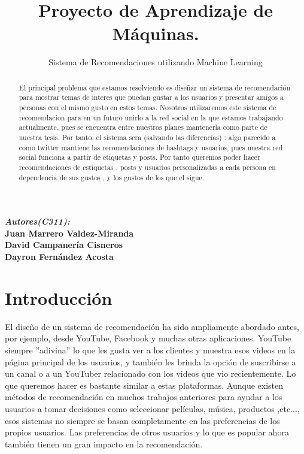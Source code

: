 \documentclass[12pt,a4paper]{article}
\author{Sistema de Recomendaciones utilizando Machine Learning}
\title{Proyecto de Aprendizaje de Máquinas.}
\begin{document}
\maketitle
\begin{abstract}
El principal problema que estamos resolviendo es diseñar un sistema de recomendación para mostrar temas de interes que puedan gustar a los usuarios y presentar amigos a personas con el mismo gusto en estos temas. Nosotros utilizaremos este sistema de recomendacion para en un futuro unirlo a la red social en la que estamos trabajando actualmente, pues se encuentra entre nuestros planes mantenerla como parte de nuestra tesis. Por tanto, el sistema sera (salvando las diferencias) : algo parecido a como twitter mantiene las recomendaciones de hashtags y usuarios, pues nuestra red social funciona a partir de etiquetas y posts. Por tanto queremos poder hacer recomendaciones de estiquetas , posts y usuarios  personalizadas a cada persona en dependencia de sus gustos , y los gustos de los que el sigue.
\end{abstract}
\textbf{\textit{Autores(C311):\\}}
\textbf{Juan Marrero Valdez-Miranda\\}
\textbf{David Campanería Cisneros\\}
\textbf{Dayron Fernández Acosta\\}
\newpage
\tableofcontents

\newpage
\section*{Introducción}

El diseño de un sistema de recomendación ha sido ampliamente abordado antes, por ejemplo, desde YouTube, Facebook y muchas otras aplicaciones. YouTube siempre ''adivina'' lo que les gusta ver a los clientes y muestra esos videos en la página principal de los usuarios, y también les brinda la opción de suscribirse a un canal o a un YouTuber relacionado con los videos que vio recientemente. Lo que queremos hacer es bastante similar a estas plataformas. Aunque existen métodos de recomendación en muchos trabajos anteriores para ayudar a los usuarios a tomar decisiones como seleccionar películas, música, productos ,etc..., esos sistemas no siempre se basan completamente en las preferencias de los propios usuarios. Las preferencias de otros usuarios y lo que es popular ahora también tienen un gran impacto en la recomendación.
\end{document}
